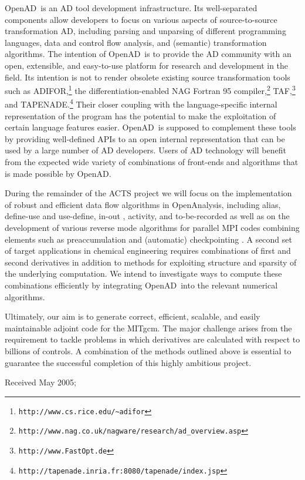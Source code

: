 \documentclass[acmtocl,acmnow]{acmtrans2m}
\newcommand{\OpenAD}{OpenAD}
\newcommand{\OpenAnalysis}{OpenAnalysis}
\begin{document}
\OpenAD\ is an AD tool development infrastructure. Its well-separated components
allow developers to focus on various aspects of source-to-source 
transformation AD, including parsing and unparsing of different programming
languages, data and control flow analysis, and (semantic) transformation 
algorithms. The intention of \OpenAD\ is to provide the AD community with 
an open, extensible, and easy-to-use platform for research and development
in the field. Its intention is not to render obsolete existing source transformation
tools such as ADIFOR,\footnote{{\tt http://www.cs.rice.edu/\~\!adifor}} 
the differentiation-enabled NAG Fortran 95 
compiler,\footnote{{\tt http://www.nag.co.uk/nagware/research/ad\_overview.asp}} TAF,\footnote{{\tt http://www.FastOpt.de}} and TAPENADE.\footnote{{\tt http://tapenade.inria.fr:8080/tapenade/index.jsp}} 
Their closer coupling with the language-specific internal representation of 
the program has the potential to make the
exploitation of certain language features easier. \OpenAD\ is supposed to 
complement these tools by providing well-defined APIs to an open internal 
representation that can be used by a large number of AD developers.
Users of AD technology will benefit from the expected wide
variety of combinations of front-ends and algorithms that is made possible
by \OpenAD.

During the remainder of the ACTS project we will focus on the implementation
of robust and efficient data flow algorithms in \OpenAnalysis, including alias, 
define-use and use-define, in-out \cite{Muc97}, 
activity, and to-be-recorded \cite{HNP02} as well as on 
the development of various reverse mode algorithms for parallel MPI codes
combining elements such as preaccumulation and (automatic) checkpointing
\cite{Gri92}. 
A second set of target 
applications in chemical engineering \cite{FTB97} requires combinations of first and 
second derivatives in addition to methods for exploiting structure and sparsity
of the underlying computation. We intend to investigate ways to compute these
combinations efficiently by integrating \OpenAD\ into the relevant 
numerical algorithms.

Ultimately, our aim is to generate correct, efficient, scalable, and easily 
maintainable adjoint code for the MITgcm. The major challenge arises from the
requirement to tackle problems in which derivatives are calculated with respect 
to billions of controls. A combination of the methods outlined above is 
essential to guarantee the successful completion of this highly ambitious
project.





\begin{received}
Received May 2005;
\end{received}
\end{document}
